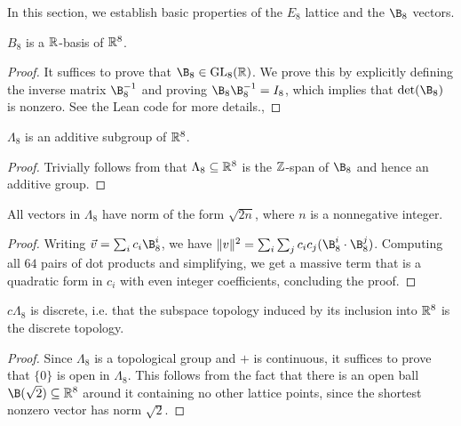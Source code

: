 In this section, we establish basic properties of the $E_8$ lattice and the $\B_8$ vectors.

\begin{lemma}\label{E8-is-basis}\leanok
  $B_8$ is a $\mathbb{R}$-basis of $\mathbb{R}^8$.
\end{lemma}
\begin{proof}\leanok
  It suffices to prove that $\B_8 \in \mathrm{GL}_8(\R)$. We prove this by explicitly defining the inverse matrix $\B_8^{-1}$ and proving $\B_8 \B_8^{-1} = I_8$, which implies that $\det(\B_8)$ is nonzero. See the Lean code for more details.,
\end{proof}

\begin{lemma}\label{E8-Lattice}\leanok
  $\Lambda_8$ is an additive subgroup of $\mathbb{R}^8$.
\end{lemma}
\begin{proof}\leanok
  Trivially follows from that $\Lambda_8 \subseteq \mathbb{R}^8$ is the $\mathbb{Z}$-span of $\B_8$ and hence an additive group.
\end{proof}

\begin{lemma}\label{E8-vector-norms}\leanok
  All vectors in $\Lambda_8$ have norm of the form $\sqrt{2n}$, where $n$ is a nonnegative integer.
\end{lemma}
\begin{proof}\leanok
  Writing $\vec{v} = \sum_i c_i\B_8^i$, we have $\|v\|^2 = \sum_i \sum_j c_ic_j (\B_8^i \cdot \B_8^j)$. Computing all $64$ pairs of dot products and simplifying, we get a massive term that is a quadratic form in $c_i$ with even integer coefficients, concluding the proof.
\end{proof}

\begin{lemma}\label{instDiscreteE8Lattice}\leanok
  $c\Lambda_8$ is discrete, i.e. that the subspace topology induced by its inclusion into $\mathbb{R}^8$ is the discrete topology.
\end{lemma}
\begin{proof}\leanok
  Since $\Lambda_8$ is a topological group and $+$ is continuous, it suffices to prove that $\{0\}$ is open in $\Lambda_8$. This follows from the fact that there is an open ball $\B(\sqrt{2}) \subseteq \R^8$ around it containing no other lattice points, since the shortest nonzero vector has norm $\sqrt{2}$.
\end{proof}

